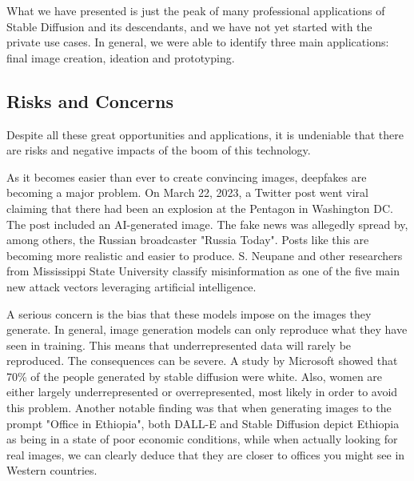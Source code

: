 \documentclass[11pt]{article}
\begin{document}
What we have presented is just the peak of many professional applications of Stable Diffusion and its descendants, and we have not yet started with the private use cases. In general, we were able to identify three main applications: final image creation, ideation and prototyping.

\subsection{Risks and Concerns}
Despite all these great opportunities and applications, it is undeniable that there are risks and negative impacts of the boom of this technology.

As it becomes easier than ever to create convincing images, deepfakes are becoming a major problem. On March 22, 2023, a Twitter post went viral claiming that there had been an explosion at the Pentagon in Washington DC. The post included an AI-generated image. The fake news was allegedly spread by, among others, the Russian broadcaster "Russia Today"\cite{correctiv2023pentagonexplosion}. Posts like this are becoming more realistic and easier to produce. S. Neupane and other researchers from Mississippi State University\cite{neupane2023impactsriskgenerativeai} classify misinformation as one of the five main new attack vectors leveraging artificial intelligence.

A serious concern is the bias that these models impose on the images they generate. In general, image generation models can only reproduce what they have seen in training. This means that underrepresented data will rarely be reproduced. The consequences can be severe. A study by Microsoft\cite{naik2023socialbiasesthroughtexttoimage} showed that 70\% of the people generated by stable diffusion were white. Also, women are either largely underrepresented or overrepresented, most likely in order to avoid this problem. Another notable finding was that when generating images to the prompt "Office in Ethiopia", both DALL-E and Stable Diffusion depict Ethiopia as being in a state of poor economic conditions, while when actually looking for real images, we can clearly deduce that they are closer to offices you might see in Western countries.
\end{document}
